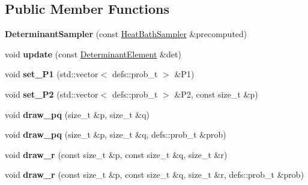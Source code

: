 \subsection*{Public Member Functions}
\begin{DoxyCompactItemize}
\item 
{\bfseries Determinant\+Sampler} (const \hyperlink{classHeatBathSampler}{Heat\+Bath\+Sampler} \&precomputed)\hypertarget{classDeterminantSampler_abb078a6f42fccf201b920c09ba76046b}{}\label{classDeterminantSampler_abb078a6f42fccf201b920c09ba76046b}

\item 
void {\bfseries update} (const \hyperlink{classDeterminantElement}{Determinant\+Element} \&det)\hypertarget{classDeterminantSampler_a2b2dfe2ed07235bb2b4164f992c2bdf2}{}\label{classDeterminantSampler_a2b2dfe2ed07235bb2b4164f992c2bdf2}

\item 
void {\bfseries set\+\_\+\+P1} (std\+::vector$<$ defs\+::prob\+\_\+t $>$ \&P1)\hypertarget{classDeterminantSampler_a19293ae543a7207feea79427e1f55727}{}\label{classDeterminantSampler_a19293ae543a7207feea79427e1f55727}

\item 
void {\bfseries set\+\_\+\+P2} (std\+::vector$<$ defs\+::prob\+\_\+t $>$ \&P2, const size\+\_\+t \&p)\hypertarget{classDeterminantSampler_a3c74bd49213c83a20b387cc2a9421505}{}\label{classDeterminantSampler_a3c74bd49213c83a20b387cc2a9421505}

\item 
void {\bfseries draw\+\_\+pq} (size\+\_\+t \&p, size\+\_\+t \&q)\hypertarget{classDeterminantSampler_a0dc046b3b9ecfaae06c89c1c1933460f}{}\label{classDeterminantSampler_a0dc046b3b9ecfaae06c89c1c1933460f}

\item 
void {\bfseries draw\+\_\+pq} (size\+\_\+t \&p, size\+\_\+t \&q, defs\+::prob\+\_\+t \&prob)\hypertarget{classDeterminantSampler_ae9eb1d7f8e68b1dc5da726ed7b2c8ed7}{}\label{classDeterminantSampler_ae9eb1d7f8e68b1dc5da726ed7b2c8ed7}

\item 
void {\bfseries draw\+\_\+r} (const size\+\_\+t \&p, const size\+\_\+t \&q, size\+\_\+t \&r)\hypertarget{classDeterminantSampler_ace140c1bcbf11e1f9b1ed147bfa915b8}{}\label{classDeterminantSampler_ace140c1bcbf11e1f9b1ed147bfa915b8}

\item 
void {\bfseries draw\+\_\+r} (const size\+\_\+t \&p, const size\+\_\+t \&q, size\+\_\+t \&r, defs\+::prob\+\_\+t \&prob)\hypertarget{classDeterminantSampler_a12a39a2f854b9da9802bf2b51a2caa3a}{}\label{classDeterminantSampler_a12a39a2f854b9da9802bf2b51a2caa3a}


\end{DoxyCompactItemize}
